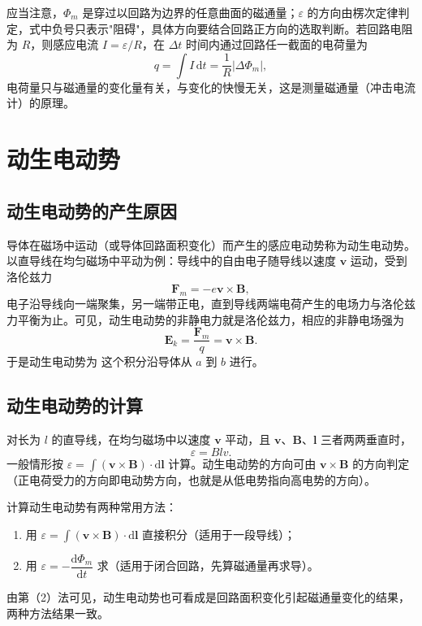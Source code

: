     应当注意，$\Phi_m$ 是穿过以回路为边界的任意曲面的磁通量；$\varepsilon$ 的方向由楞次定律判定，式中负号只表示"阻碍"，具体方向要结合回路正方向的选取判断。若回路电阻为 $R$，则感应电流 $I=\varepsilon/R$，在 $\Delta t$ 时间内通过回路任一截面的电荷量为
    \[
    q=\int I\,\mathrm{d}t=\frac{1}{R}\left|\Delta\Phi_m\right|,
    \]
    电荷量只与磁通量的变化量有关，与变化的快慢无关，这是测量磁通量（冲击电流计）的原理。


\section{动生电动势}
    \subsection{动生电动势的产生原因}
    导体在磁场中运动（或导体回路面积变化）而产生的感应电动势称为动生电动势。以直导线在均匀磁场中平动为例：导线中的自由电子随导线以速度 $\boldsymbol{v}$ 运动，受到洛伦兹力
    \[
    \boldsymbol{F}_m=-e\boldsymbol{v}\times\boldsymbol{B},
    \]
    电子沿导线向一端聚集，另一端带正电，直到导线两端电荷产生的电场力与洛伦兹力平衡为止。可见，动生电动势的非静电力就是洛伦兹力，相应的非静电场强为
    \[
    \boldsymbol{E}_k=\frac{\boldsymbol{F}_m}{q}=\boldsymbol{v}\times\boldsymbol{B}.
    \]
    于是动生电动势为
    这个积分沿导体从 $a$ 到 $b$ 进行。

    \subsection{动生电动势的计算}
    对长为 $l$ 的直导线，在均匀磁场中以速度 $\boldsymbol{v}$ 平动，且 $\boldsymbol{v}$、$\boldsymbol{B}$、$\boldsymbol{l}$ 三者两两垂直时，
    \[
    \varepsilon=Blv.
    \]
    一般情形按 $\varepsilon=\int(\boldsymbol{v}\times\boldsymbol{B})\cdot\mathrm{d}\boldsymbol{l}$ 计算。动生电动势的方向可由 $\boldsymbol{v}\times\boldsymbol{B}$ 的方向判定（正电荷受力的方向即电动势方向，也就是从低电势指向高电势的方向）。

    计算动生电动势有两种常用方法：
    \begin{enumerate}
        \item 用 $\varepsilon=\int(\boldsymbol{v}\times\boldsymbol{B})\cdot\mathrm{d}\boldsymbol{l}$ 直接积分（适用于一段导线）；
        \item 用 $\varepsilon=-\dfrac{\mathrm{d}\Phi_m}{\mathrm{d}t}$ 求（适用于闭合回路，先算磁通量再求导）。
    \end{enumerate}
    由第（2）法可见，动生电动势也可看成是回路面积变化引起磁通量变化的结果，两种方法结果一致。

